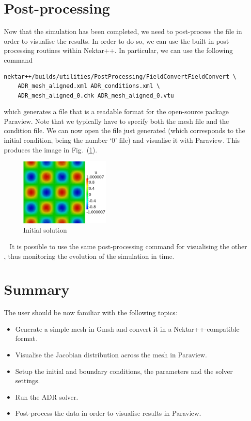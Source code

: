 \section{Post-processing}
\label{adr-post}
Now that the simulation has been completed, we need to post-process the file in order to visualise 
the results. In order to do so, we can use the built-in post-processing routines within Nektar++.
In particular, we can use the following command
%
\begin{lstlisting}[style=BashInputStyle]
nektar++/builds/utilities/PostProcessing/FieldConvertFieldConvert \
    ADR_mesh_aligned.xml ADR_conditions.xml \ 
    ADR_mesh_aligned_0.chk ADR_mesh_aligned_0.vtu
\end{lstlisting}
%
which generates a  file that is a readable format for the open-source package Paraview.
Note that we typically have to specify both the mesh  file and the condition  
file. We can now open the \inlsh{.vtu} file just generated (which corresponds to the initial condition, 
being the number `0' \inlsh{.chk} file) and visualise it with Paraview. This produces the image 
in Fig.~(\ref{f:IC}).
%
\begin{figure}[h!]
\centering
\includegraphics[width=0.4\textwidth]{Figures/ADR_mesh_IC}
\caption{Initial solution}
\label{f:IC}
\end{figure}~
%
It is possible to use the same post-processing command for visualising the other , 
thus monitoring the evolution of the simulation in time.  


\section{Summary}
The user should be now familiar with the following topics:
\vspace{-0.5cm}
\begin{itemize}
\item Generate a simple mesh in Gmsh and convert it in a Nektar++-compatible format.
\item Visualise the Jacobian distribution across the mesh in Paraview.
\item Setup the initial and boundary conditions, the parameters and the solver settings.
\item Run the ADR solver.
\item Post-process the data in order to visualise results in Paraview.
\end{itemize}


